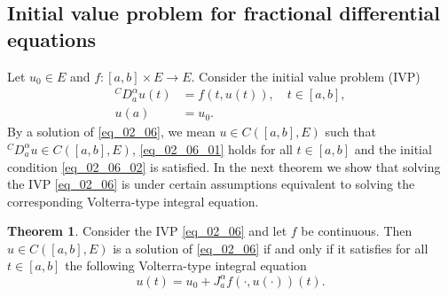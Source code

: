 \documentclass[reqno]{amsart}
\numberwithin{equation}{section}
\theoremstyle{definition}
\newtheorem{theorem}{Theorem}
\theoremstyle{remark}
\newcommand{\br}[1]{\left(#1\right)}
\newcommand{\C}[2]{C\br{#1,#2}}
\newcommand{\DC}[3]{{}^{C}\!D^{#1}_{#2}{#3}}
\newcommand{\JRL}[3]{J^{#1}_{#2}{#3}}
\newcommand{\sbr}[1]{\left[#1\right]}
\newcommand{\st}{\!:}
\begin{document}
	\subsection{Initial value problem for fractional differential equations}\label{sec_02_04}
	Let $u_0\in{E}$ and $f\st\sbr{a,b}\times{E}\rightarrow{E}$. Consider the initial value problem (IVP)
	\begin{subequations}\label{eq_02_06}
		\begin{align}
			\DC{\alpha}{a}{u}\br{t}&=f\br{t,u\br{t}},\quad{t}\in\sbr{a,b},\label{eq_02_06_01}\\
			u\br{a}&=u_0.\label{eq_02_06_02}
		\end{align}
	\end{subequations}
	By a solution of \eqref{eq_02_06}, we mean $u\in\C{\sbr{a,b}}{E}$ such that $\DC{\alpha}{a}{u}\in\C{\sbr{a,b}}{E}$, \eqref{eq_02_06_01} holds for all $t\in\sbr{a,b}$ and the initial condition \eqref{eq_02_06_02} is satisfied. In the next theorem we show that solving the IVP \eqref{eq_02_06} is under certain assumptions equivalent to solving the corresponding Volterra-type integral equation.
	\begin{theorem}\label{thm_09}
		Consider the IVP \eqref{eq_02_06} and let $f$ be continuous. Then $u\in\C{\sbr{a,b}}{E}$ is a solution of \eqref{eq_02_06} if and only if it satisfies for all $t\in\sbr{a,b}$ the following Volterra-type integral equation
		\begin{equation}\label{eq_02_07}
			u\br{t}=u_0+\JRL{\alpha}{a}{f\br{\cdot,u\br{\cdot}}}\br{t}.
		\end{equation}
	\end{theorem}
\end{document}
